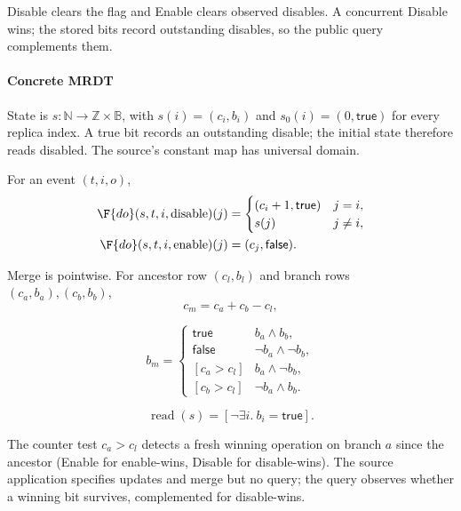 



Disable clears the flag and Enable clears observed disables. A concurrent Disable wins; the stored bits record outstanding disables, so the public query complements them.

\paragraph{Concrete MRDT}
State is $s:\mathbb N\to\mathbb Z\times\mathbb B$, with $s(i)=(c_i,b_i)$ and $s_0(i)=(0,\mathsf{true})$ for every replica index. A true bit records an outstanding disable; the initial state therefore reads disabled. The source's constant map has universal domain.

For an event $(t,i,o)$,
\[
\begin{aligned}
\F{do}(s,t,i,\mathrm{disable})(j)&=\begin{cases}(c_i+1,\mathsf{true})&j=i,\\s(j)&j\ne i,\end{cases}\\
\F{do}(s,t,i,\mathrm{enable})(j)&=(c_j,\mathsf{false}).
\end{aligned}
\]


Merge is pointwise. For ancestor row $(c_l,b_l)$ and branch rows $(c_a,b_a),(c_b,b_b)$,
\[
c_m=c_a+c_b-c_l,
\]

\[
b_m=\begin{cases}
\mathsf{true}&b_a\land b_b,\\
\mathsf{false}&\neg b_a\land\neg b_b,\\
[c_a>c_l]&b_a\land\neg b_b,\\
[c_b>c_l]&\neg b_a\land b_b.
\end{cases}
\]

\[
\operatorname{read}(s)=[\neg\exists i.\ b_i=\mathsf{true}].
\]

The counter test $c_a>c_l$ detects a fresh winning operation on branch $a$
since the ancestor (Enable for enable-wins, Disable for disable-wins). The
source application specifies updates and merge but no query; the query
observes whether a winning bit survives, complemented for disable-wins.


